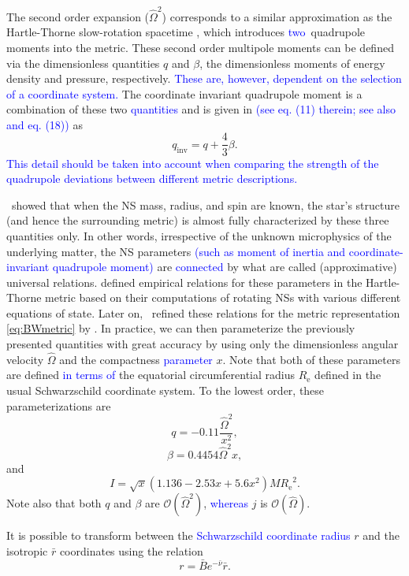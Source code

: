\documentclass{aa}
\newcommand{\be}{\begin{equation}}
\newcommand{\ee}{\end{equation}}
\newcommand{\refe}[1]{\textcolor{blue}{{#1}}}
\newcommand{\refedel}[1]{}
\newcommand{\Req}{\ensuremath{R_{\mathrm{e}}}}
\newcommand{\sch}{Schwarzschild }
\newcommand{\rb}{\ensuremath{\bar{r}}}
\newcommand{\Ob}{\ensuremath{\hat{\Omega}}}
\newcommand{\nub}{\ensuremath{\bar{\nu}}}
\newcommand{\Bb}{\ensuremath{\bar{B}}}
\newcommand{\qinv}{\ensuremath{q_{\mathrm{inv}}}}
\begin{document}
The second order expansion ($\Ob^2$) corresponds to a similar approximation as the Hartle-Thorne slow-rotation spacetime \citep{HT68}, which introduces \refe{two} quadrupole moments into the metric.  
These second order multipole moments can be defined via the dimensionless quantities $q$ and $\beta$, the dimensionless moments of energy density and pressure, respectively.
\refe{These are, however, dependent on the selection of a coordinate system.}
The coordinate invariant quadrupole moment\refedel{, on the other hand,} is a combination of these two \refedel{factors}\refe{quantities} and is given in \citet{PA12} \refe{(see eq. (11) therein; see also \citealt{aGM14} and eq. (18))} as
\be
\qinv =  q + \frac{4}{3} \beta.
\ee
\refe{This detail should be taken into account when comparing the strength of the quadrupole deviations between different metric descriptions.}


\citet{YY13} showed that when the NS mass, radius, and spin are known, the star's structure (and hence the surrounding metric) is almost fully characterized by these three quantities only. %
In other words, irrespective of the unknown microphysics of the underlying matter, the NS parameters \refe{(such as moment of inertia and coordinate-invariant quadrupole moment)} are \refe{connected} by what are called (approximative) universal relations.
\citet{BBP13} defined empirical relations for these parameters in the Hartle-Thorne metric based on their computations of rotating NSs with various different equations of state.
Later on, \citet{aGM14} refined these relations for the metric representation \eqref{eq:BWmetric} by \citet{BI76}.
In practice, we can then parameterize the previously presented quantities with great accuracy by using only the dimensionless angular velocity $\Ob$ and the compactness \refe{parameter} $x$.
Note that both of these parameters are defined \refe{in terms of} the equatorial circumferential radius $\Req$ defined in the usual \sch coordinate system.
To the lowest order, these parameterizations are \citep{aGM14}
\be\label{eq:quad}
q = -0.11 \frac{\Ob^2}{x^2},
\ee
\be\label{eq:beta}
\beta = 0.4454 \Ob^2 x,
\ee
and
\be\label{eq:I}
I = \sqrt{x} (1.136 - 2.53 x + 5.6 x^2) M \Req^2.
\ee
Note also that both $q$ and $\beta$ are $\mathcal{O}(\Ob^2)$, \refe{whereas} $j$ is $\mathcal{O}(\Ob)$.
    
It is possible to transform between the \refe{\sch coordinate radius} $r$ and the isotropic $\rb$ coordinates using the relation \citep{FIP86}
\be\label{eq:rb2r}
r = \Bb e^{-\nub} \rb.
\ee
\end{document}
